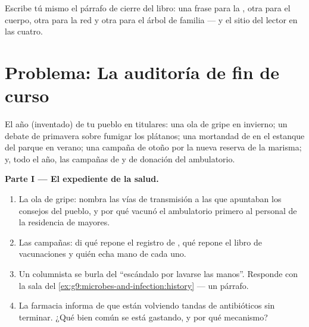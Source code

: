 \begin{exercise}[$\star\star\star$]\label{exo:g9:our-responsibility:12}
Escribe tú mismo el párrafo de cierre del libro: una frase para la
, otra para el cuerpo, otra para la red y otra para el árbol de
familia --- y el sitio del lector en las cuatro.
\end{exercise}

\section{Problema: La auditoría de fin de curso}

\begin{problem}\label{pb:g9:our-responsibility:1}
El año (inventado) de tu pueblo en titulares: una ola de gripe en
invierno; un debate de primavera sobre fumigar los plátanos; una
mortandad de  en el estanque del parque en verano; una campaña de
otoño por la nueva reserva de la marisma; y, todo el año, las campañas
de  y de donación del ambulatorio.

\medskip\noindent\textbf{Parte I --- El expediente de la salud.}
\begin{enumerate}
  \item La ola de gripe: nombra las vías de transmisión a las que
        apuntaban los consejos del pueblo, y por qué vacunó el
        ambulatorio primero al personal de la residencia de mayores.
  \item Las campañas: di qué repone el registro de , qué repone
        el libro de vacunaciones y quién echa mano de cada uno.
  \item Un columnista se burla del ``escándalo por lavarse las manos''.
        Responde con la sala del
        \cref{ex:g9:microbes-and-infection:history} --- un párrafo.
  \item La farmacia informa de que están volviendo tandas de
        antibióticos sin terminar. ¿Qué bien común se está gastando, y
        por qué mecanismo?
\end{enumerate}


\end{problem}
